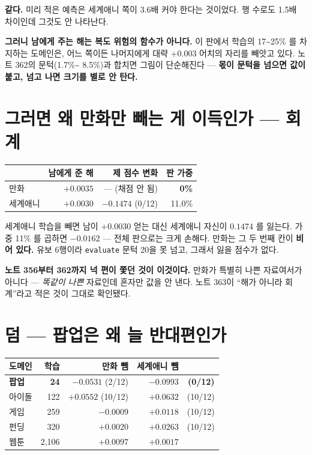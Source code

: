 \documentclass[11pt]{article}
\begin{document}
\textbf{같다.} 미리 적은 예측은 세계애니 쪽이 3.6배 커야 한다는 것이었다.
행 수로도 1.5배 차이인데 그것도 안 나타난다.

\textbf{그러니 남에게 주는 해는 복도 위험의 함수가 아니다.} 이 판에서
학습의 17\textasciitilde{}25\% 를 차지하는 도메인은, 어느 쪽이든 나머지에게
대략 $+0.003$ 어치의 자리를 빼앗고 있다. 노트 362의 문턱(1.7\%\textasciitilde
{}8.5\%)과 합치면 그림이 단순해진다 --- \textbf{몫이 문턱을 넘으면 값이
붙고, 넘고 나면 크기를 별로 안 탄다.}

\section{그러면 왜 만화만 빼는 게 이득인가 --- 회계}

\begin{center}
\begin{tabular}{lrrr}
\hline
 & 남에게 준 해 & 제 점수 변화 & 판 가중 \\
\hline
만화     & $+0.0035$ & --- (채점 안 됨) & \textbf{0\%} \\
세계애니 & $+0.0030$ & $\mathbf{-0.1474}$ (0/12) & 11.0\% \\
\hline
\end{tabular}
\end{center}

세계애니 학습을 빼면 남이 $+0.0030$ 얻는 대신 세계애니 자신이 $0.1474$ 를
잃는다. 가중 11\% 를 곱하면 $-0.0162$ --- 전체 판으로는 크게 손해다.
만화는 그 두 번째 칸이 \textbf{비어 있다.} 유보 6행이라 \texttt{evaluate}
문턱 20을 못 넘고, 그래서 잃을 점수가 없다.

\textbf{노트 356부터 362까지 넉 편이 쫓던 것이 이것이다.} 만화가 특별히
나쁜 자료여서가 아니다 --- \emph{똑같이 나쁜} 자료인데 혼자만 값을 안 낸다.
노트 363이 ``해가 아니라 회계''라고 적은 것이 그대로 확인됐다.

\section{덤 --- 팝업은 왜 늘 반대편인가}

\begin{center}
\begin{tabular}{lrrrr}
\hline
도메인 & 학습 & 만화 뺌 & 세계애니 뺌 & \\
\hline
\textbf{팝업} & \textbf{24} & $-0.0531$ (2/12) & $\mathbf{-0.0993}$ & \textbf{(0/12)} \\
아이돌 & 122 & $+0.0552$ (10/12) & $+0.0632$ & (10/12) \\
게임   & 259 & $-0.0009$ & $+0.0118$ & (10/12) \\
펀딩   & 320 & $+0.0020$ & $+0.0263$ & (10/12) \\
웹툰   & 2,106 & $+0.0097$ & $+0.0017$ & \\
\hline
\end{tabular}
\end{center}
\end{document}
